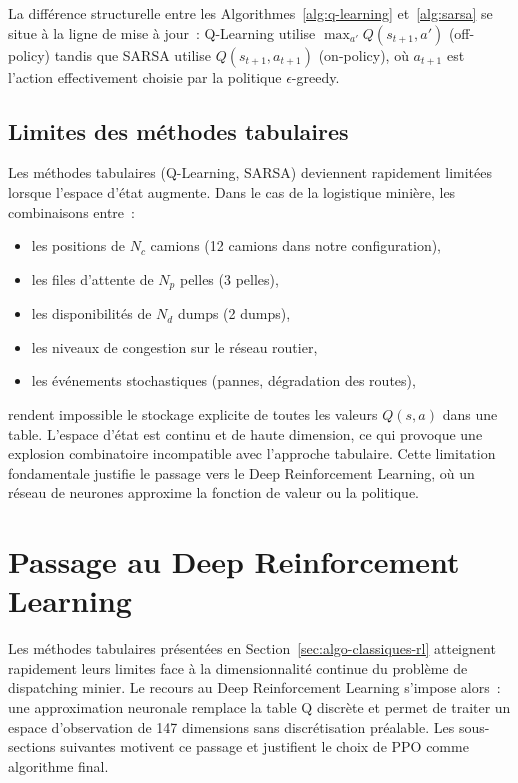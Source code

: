 \documentclass[11pt,a4paper]{report}
\begin{document}
La différence structurelle entre les Algorithmes~\ref{alg:q-learning} et~\ref{alg:sarsa} se situe à la ligne de mise à jour~: Q-Learning utilise $\max_{a'} Q(s_{t+1}, a')$ (off-policy) tandis que SARSA utilise $Q(s_{t+1}, a_{t+1})$ (on-policy), où $a_{t+1}$ est l'action effectivement choisie par la politique $\epsilon$-greedy.

\subsection{Limites des méthodes tabulaires}
\label{sec:limites-tabulaires}
Les méthodes tabulaires (Q-Learning, SARSA) deviennent rapidement limitées lorsque l'espace d'état augmente. Dans le cas de la logistique minière, les combinaisons entre~:
\begin{itemize}
    \item les positions de $N_c$ camions (12 camions dans notre configuration),
    \item les files d'attente de $N_p$ pelles (3 pelles),
    \item les disponibilités de $N_d$ dumps (2 dumps),
    \item les niveaux de congestion sur le réseau routier,
    \item les événements stochastiques (pannes, dégradation des routes),
\end{itemize}
rendent impossible le stockage explicite de toutes les valeurs $Q(s, a)$ dans une table. L'espace d'état est continu et de haute dimension, ce qui provoque une explosion combinatoire incompatible avec l'approche tabulaire. Cette limitation fondamentale justifie le passage vers le Deep Reinforcement Learning, où un réseau de neurones approxime la fonction de valeur ou la politique.

\section{Passage au Deep Reinforcement Learning}
\label{sec:passage-deep-rl}

Les méthodes tabulaires présentées en Section~\ref{sec:algo-classiques-rl} atteignent rapidement leurs limites face à la dimensionnalité continue du problème de dispatching minier. Le recours au Deep Reinforcement Learning s'impose alors~: une approximation neuronale remplace la table Q discrète et permet de traiter un espace d'observation de 147 dimensions sans discrétisation préalable. Les sous-sections suivantes motivent ce passage et justifient le choix de PPO comme algorithme final.
\end{document}
